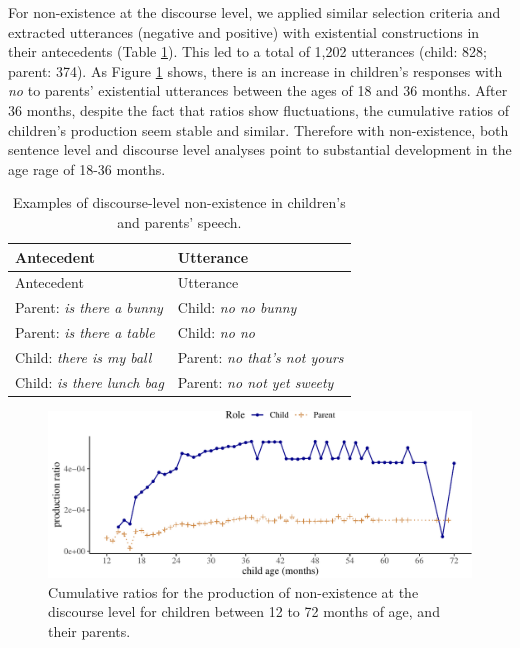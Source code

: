 \documentclass[
  english,
  man,floatsintext]{apa6}
\begin{document}
For non-existence at the discourse level, we applied similar selection criteria and extracted utterances (negative and positive) with existential constructions in their antecedents (Table \ref{tab:disexist}). This led to a total of 1,202 utterances (child: 828; parent: 374). As Figure \ref{fig:existencediscourse} shows, there is an increase in children's responses with \emph{no} to parents' existential utterances between the ages of 18 and 36 months. After 36 months, despite the fact that ratios show fluctuations, the cumulative ratios of children's production seem stable and similar. Therefore with non-existence, both sentence level and discourse level analyses point to substantial development in the age rage of 18-36 months.

\begin{longtable}[]{@{}ll@{}}
\caption{\label{tab:disexist} Examples of discourse-level non-existence in children's and parents' speech.}\tabularnewline
\toprule
Antecedent & Utterance \\
\midrule
\endfirsthead
\toprule
Antecedent & Utterance \\
\midrule
\endhead
Parent: \emph{is there a bunny} & Child: \emph{no no bunny} \\
Parent: \emph{is there a table} & Child: \emph{no no} \\
Child: \emph{there is my ball} & Parent: \emph{no that's not yours} \\
Child: \emph{is there lunch bag} & Parent: \emph{no not yet sweety} \\
\bottomrule
\end{longtable}

\begin{figure}[H]

{\centering \includegraphics{neg_construction_article_files/figure-latex/existencediscourse-1} 

}

\caption{Cumulative ratios for the production of non-existence at the discourse level for children between 12 to 72 months of age, and their parents.}\label{fig:existencediscourse}
\end{figure}
\end{document}
